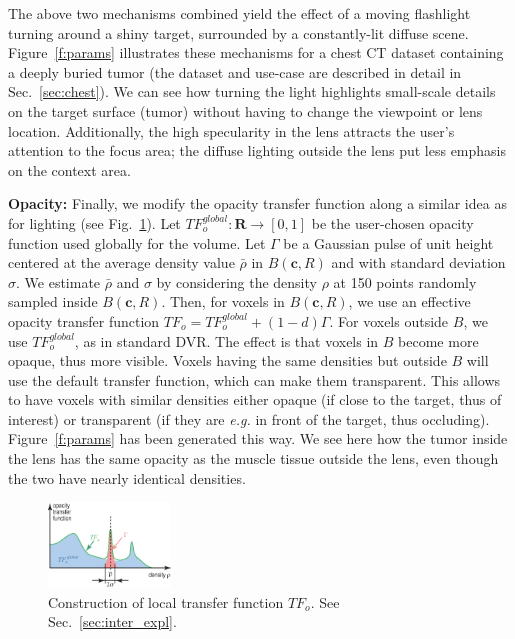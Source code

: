 The above two mechanisms combined yield the effect of a moving flashlight turning around a shiny target, surrounded by a constantly-lit diffuse scene. Figure~\ref{f:params} illustrates these mechanisms for a chest CT dataset containing a deeply buried tumor (the dataset and use-case are described in detail in Sec.~\ref{sec:chest}). We can see how turning the light highlights small-scale details on the target surface (tumor) without having to change the viewpoint or lens location. Additionally, the high specularity in the lens attracts the user's attention to the focus area; the diffuse lighting outside the lens put less emphasis on the context area. 

\vspace{0.2cm}
\noindent\textbf{Opacity:} Finally, we modify the opacity transfer function along a similar idea as for lighting (see Fig.~\ref{fig:tf}). Let $TF_{o}^{global} : \mathbf{R} \rightarrow [0,1]$ be the user-chosen opacity function used globally for the volume. Let $\Gamma$ be a Gaussian pulse of unit height centered at the average density value $\bar{\rho}$ in $B(\mathbf{c},R)$ and with standard deviation $\sigma$. We estimate $\bar{\rho}$ and $\sigma$ by considering the density $\rho$ at 150 points randomly sampled inside $B(\mathbf{c},R)$. Then, for voxels in $B(\mathbf{c},R)$, we use an effective opacity transfer function $TF_o = TF_{o}^{global} + (1-d) \Gamma$. For voxels outside $B$, we use $TF_{o}^{global}$, as in standard DVR. The effect is that voxels in $B$ become more opaque, thus more visible. Voxels having the same densities but outside $B$ will use the default transfer function, which can make them transparent. This allows to have voxels with similar densities either opaque (if close to the target, thus of interest) or transparent (if they are \emph{e.g.} in front of the target, thus occluding). Figure~\ref{f:params} has been generated this way. We see here how the tumor inside the lens has the same opacity as the muscle tissue outside the lens, even though the two have nearly identical densities.

\begin{figure}[htbp!]
\centering
\includegraphics[width=0.29\textwidth]{images/tf.eps}
\caption{Construction of local transfer function $TF_{o}$. See Sec.~\ref{sec:inter_expl}.}
\label{fig:tf}
\end{figure}


